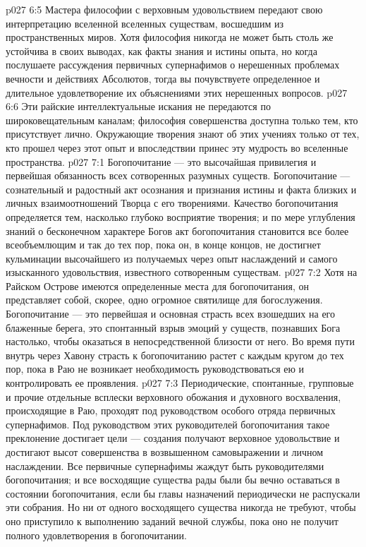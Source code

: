 \vs p027 6:5 Мастера философии с верховным удовольствием передают свою интерпретацию вселенной вселенных существам, восшедшим из пространственных миров. Хотя философия никогда не может быть столь же устойчива в своих выводах, как факты знания и истины опыта, но когда послушаете рассуждения первичных супернафимов о нерешенных проблемах вечности и действиях Абсолютов, тогда вы почувствуете определенное и длительное удовлетворение их объяснениями этих нерешенных вопросов.
\vs p027 6:6 Эти райские интеллектуальные искания не передаются по широковещательным каналам; философия совершенства доступна только тем, кто присутствует лично. Окружающие творения знают об этих учениях только от тех, кто прошел через этот опыт и впоследствии принес эту мудрость во вселенные пространства.
\vs p027 7:1 Богопочитание --- это высочайшая привилегия и первейшая обязанность всех сотворенных разумных существ. Богопочитание --- сознательный и радостный акт осознания и признания истины и факта близких и личных взаимоотношений Творца с его творениями. Качество богопочитания определяется тем, насколько глубоко восприятие творения; и по мере углубления знаний о бесконечном характере Богов акт богопочитания становится все более всеобъемлющим и так до тех пор, пока он, в конце концов, не достигнет кульминации высочайшего из получаемых через опыт наслаждений и самого изысканного удовольствия, известного сотворенным существам.
\vs p027 7:2 \pc Хотя на Райском Острове имеются определенные места для богопочитания, он представляет собой, скорее, одно огромное святилище для богослужения. Богопочитание --- это первейшая и основная страсть всех взошедших на его блаженные берега, это спонтанный взрыв эмоций у существ, познавших Бога настолько, чтобы оказаться в непосредственной близости от него. Во время пути внутрь через Хавону страсть к богопочитанию растет с каждым кругом до тех пор, пока в Раю не возникает необходимость руководствоваться ею и контролировать ее проявления.
\vs p027 7:3 Периодические, спонтанные, групповые и прочие отдельные всплески верховного обожания и духовного восхваления, происходящие в Раю, проходят под руководством особого отряда первичных супернафимов. Под руководством этих руководителей богопочитания такое преклонение достигает цели --- создания получают верховное удовольствие и достигают высот совершенства в возвышенном самовыражении и личном наслаждении. Все первичные супернафимы жаждут быть руководителями богопочитания; и все восходящие существа рады были бы вечно оставаться в состоянии богопочитания, если бы главы назначений периодически не распускали эти собрания. Но ни от одного восходящего существа никогда не требуют, чтобы оно приступило к выполнению заданий вечной службы, пока оно не получит полного удовлетворения в богопочитании.
